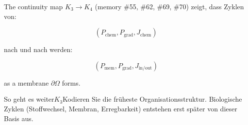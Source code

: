 The continuity map $K_3\to K_4$ (memory \#55, \#62, \#69, \#70)
zeigt, dass Zyklen von:

\[
  (P_{\mathrm{chem}}, P_{\mathrm{grad}}, J_{\mathrm{chem}})
\]

nach und nach werden:

\[
  (P_{\mathrm{mem}}, P_{\mathrm{grad}}, J_{\mathrm{in/out}})
\]

as a membrane $\partial\Omega$ forms.

So geht es weiter$K_3$Kodieren Sie die früheste Organisationsstruktur.
Biologische Zyklen (Stoffwechsel, Membran, Erregbarkeit) entstehen erst später
von dieser Basis aus.


